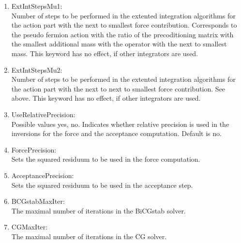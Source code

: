 \begin{enumerate}
\item {\ttfamily ExtIntStepsMu1}:\\
  Number of steps to be performed in the extented integration
  algorithms for the action part with the next to smallest force
  contribution. Corresponds to the pseudo fermion action with the
  ratio of the precoditioning matrix with the smallest additional mass
  with the operator with the next to smallest mass. This keyword has
  no effect, if other integrators are used.

\item {\ttfamily ExtIntStepsMu2}:\\
  Number of steps to be performed in the extented integration
  algorithms for the action part with the next to next to smallest force
  contribution. See above. This keyword has
  no effect, if other integrators are used.

\item {\ttfamily UseRelativePrecision}:\\
  Possible values {\ttfamily yes, no}. Indicates whether relative
  precision is used in the inversions for the force and the acceptance
  computation. Default is no.

\item {\ttfamily ForcePrecision}:\\
  Sets the squared residuum to be used in the force computation.

\item {\ttfamily AcceptancePrecision}:\\
  Sets the squared residuum to be used in the acceptance step.

\item {\ttfamily BCGstabMaxIter}:\\
  The maximal number of iterations in the BiCGstab solver.

\item {\ttfamily CGMaxIter}:\\
  The maximal number of iterations in the CG solver.

\end{enumerate}

